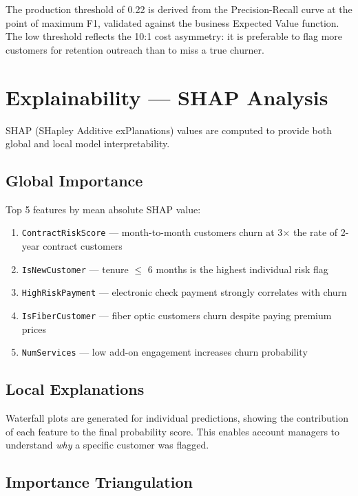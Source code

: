 \documentclass[conference]{IEEEtran}
\begin{document}
The production threshold of 0.22 is derived from the Precision-Recall curve at the point of maximum F1, validated against the business Expected Value function. The low threshold reflects the 10:1 cost asymmetry: it is preferable to flag more customers for retention outreach than to miss a true churner.

\section{Explainability --- SHAP Analysis}

SHAP (SHapley Additive exPlanations) \cite{lundberg2017} values are computed to provide both global and local model interpretability.

\subsection{Global Importance}

Top 5 features by mean absolute SHAP value:
\begin{enumerate}
    \item \texttt{ContractRiskScore} --- month-to-month customers churn at 3$\times$ the rate of 2-year contract customers
    \item \texttt{IsNewCustomer} --- tenure $\leq$ 6 months is the highest individual risk flag
    \item \texttt{HighRiskPayment} --- electronic check payment strongly correlates with churn
    \item \texttt{IsFiberCustomer} --- fiber optic customers churn despite paying premium prices
    \item \texttt{NumServices} --- low add-on engagement increases churn probability
\end{enumerate}

\subsection{Local Explanations}

Waterfall plots are generated for individual predictions, showing the contribution of each feature to the final probability score. This enables account managers to understand \textit{why} a specific customer was flagged.

\subsection{Importance Triangulation}
\end{document}
